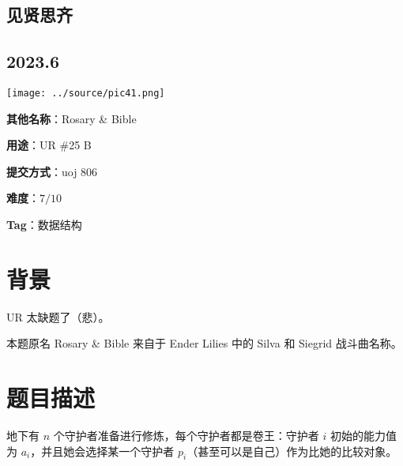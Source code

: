 \documentclass[a4paper,10pt]{article}
\begin{document}
\vspace*{\fill}
\begin{center}

\section{见贤思齐}

\subsection*{2023.6}

\vspace{10pt}

\texttt{[image: ../source/pic41.png]}

\vspace{10pt}

\textbf{其他名称}：Rosary \& Bible

\vspace{10pt}

\textbf{用途}：UR \#25 B

\vspace{10pt}

\textbf{提交方式}：uoj 806

\vspace{10pt}

\textbf{难度}：$7/10$

\vspace{10pt}

\textbf{Tag}：数据结构

\end{center}
\vspace*{\fill}

\newpage

\section*{背景}

UR 太缺题了（悲）。

本题原名 Rosary \& Bible 来自于 Ender Lilies 中的 Silva 和 Siegrid 战斗曲名称。

\section*{题目描述}

地下有 $n$ 个守护者准备进行修炼，每个守护者都是卷王：守护者 $i$ 初始的能力值为 $a_i$，并且她会选择某一个守护者 $p_i$（甚至可以是自己）作为比她的比较对象。
\end{document}
